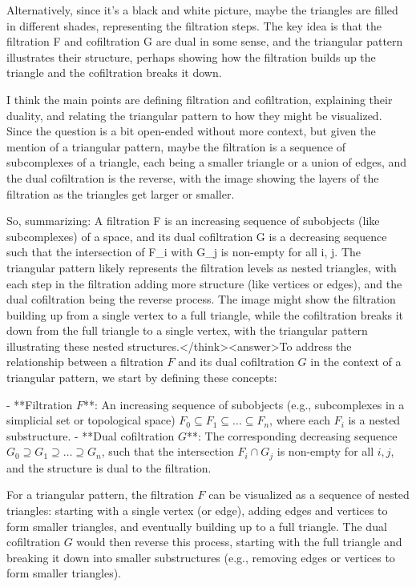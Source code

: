 Alternatively, since it's a black and white picture, maybe the triangles are filled in different shades, representing the filtration steps. The key idea is that the filtration F and cofiltration G are dual in some sense, and the triangular pattern illustrates their structure, perhaps showing how the filtration builds up the triangle and the cofiltration breaks it down. 

I think the main points are defining filtration and cofiltration, explaining their duality, and relating the triangular pattern to how they might be visualized. Since the question is a bit open-ended without more context, but given the mention of a triangular pattern, maybe the filtration is a sequence of subcomplexes of a triangle, each being a smaller triangle or a union of edges, and the dual cofiltration is the reverse, with the image showing the layers of the filtration as the triangles get larger or smaller. 

So, summarizing: A filtration F is an increasing sequence of subobjects (like subcomplexes) of a space, and its dual cofiltration G is a decreasing sequence such that the intersection of F_i with G_j is non-empty for all i, j. The triangular pattern likely represents the filtration levels as nested triangles, with each step in the filtration adding more structure (like vertices or edges), and the dual cofiltration being the reverse process. The image might show the filtration building up from a single vertex to a full triangle, while the cofiltration breaks it down from the full triangle to a single vertex, with the triangular pattern illustrating these nested structures.</think><answer>To address the relationship between a filtration \( F \) and its dual cofiltration \( G \) in the context of a triangular pattern, we start by defining these concepts:  

- **Filtration \( F \)**: An increasing sequence of subobjects (e.g., subcomplexes in a simplicial set or topological space) \( F_0 \subseteq F_1 \subseteq \dots \subseteq F_n \), where each \( F_i \) is a nested substructure.  
- **Dual cofiltration \( G \)**: The corresponding decreasing sequence \( G_0 \supseteq G_1 \supseteq \dots \supseteq G_n \), such that the intersection \( F_i \cap G_j \) is non-empty for all \( i, j \), and the structure is dual to the filtration.  

For a triangular pattern, the filtration \( F \) can be visualized as a sequence of nested triangles: starting with a single vertex (or edge), adding edges and vertices to form smaller triangles, and eventually building up to a full triangle. The dual cofiltration \( G \) would then reverse this process, starting with the full triangle and breaking it down into smaller substructures (e.g., removing edges or vertices to form smaller triangles).  

